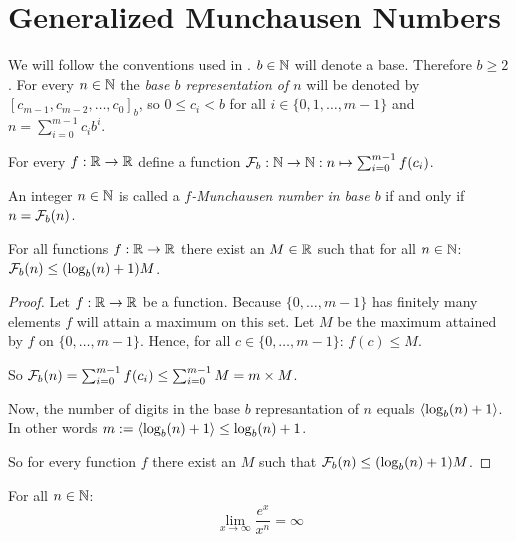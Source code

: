 \section*{Generalized Munchausen Numbers}

We will follow the conventions used in \cite{dvb}. $b\in\mathbb{N}$ will denote a base.
Therefore $b \ge 2$. For every $n \in \mathbb{N}$ the \emph{base $b$ representation
of $n$} will be denoted by $[c_{m-1}, c_{m-2}, \ldots, c_{0}]_{b}$, so 
$0 \le c_{i} < b$ for all $i \in \{0,1,\ldots,m-1\}$ and 
$n = \sum_{i=0}^{m-1} c_{i}b^{i}$.

For every $f : \mathbb{R} \rightarrow \mathbb{R}$ define a function $\mathcal{F}_{b} : \mathbb{N} \rightarrow
\mathbb{N} : n \mapsto \sum_{i=0}^{m-1} f(c_{i})$.

\begin{definition}
	An integer $n \in \mathbb{N}$ is called a \emph{$f$-Munchausen number in base $b$}
	if and only if $n = \mathcal{F}_{b}(n)$.
\end{definition}


\begin{lemma}
	For all functions $f : \mathbb{R} \rightarrow \mathbb{R}$ there exist an 
	$M \in \mathbb{R}$ such that for all $n \in \mathbb{N}$: $\mathcal{F}_{b}(n) \le (\log_{b}(n) + 1) M$.
\end{lemma}

\begin{proof}
	Let $f : \mathbb{R} \rightarrow \mathbb{R}$ be a function. Because $\{0,\ldots,m-1\}$ has 
	finitely many elements $f$ will attain a maximum on this set. Let $M$ be the
	maximum	attained by $f$ on $\{0,\ldots,m-1\}$. Hence, for all 
	$c \in \{0,\ldots,m-1\}$: $f(c) \le M$.
	
	So $\mathcal{F}_{b}(n) = \sum_{i=0}^{m-1} f(c_{i}) \le 
	\sum_{i=0}^{m-1} M = m \times M$.
	
	Now, the number of digits in the base $b$ represantation of $n$ equals 
	$\langle\log_{b}(n) + 1\rangle$. In other words $m := \langle\log_{b}(n) + 1\rangle 
	\le \log_{b}(n) + 1$.
	
	So for every function $f$ there exist an $M$ such that 
	$\mathcal{F}_{b}(n) \le (\log_{b}(n) + 1) M$.
\end{proof}

\begin{lemma}
	For all $n \in \mathbb{N}$: 
	\[
		\lim_{x \rightarrow \infty} \frac{e^{x}}{x^{n}} = \infty
	\]
\end{lemma}

